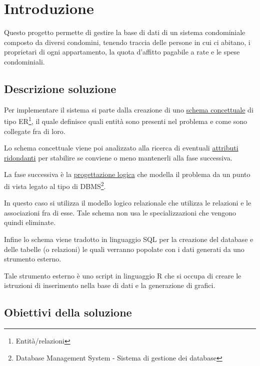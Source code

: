 \section{Introduzione}

Questo progetto permette di gestire la base di dati di
un sistema condominiale composto da diversi condomini,
tenendo traccia delle persone in cui ci abitano, i
proprietari di ogni appartamento, la quota d'affitto
pagabile a rate e le spese condominiali.

\subsection{Descrizione soluzione}

Per implementare il sistema si parte dalla creazione di uno
\hyperref[schemaER]{schema concettuale}
di tipo ER\footnote{Entità/relazioni},
il quale definisce quali entità sono presenti nel problema
e come sono collegate fra di loro.

Lo schema concettuale viene poi analizzato alla ricerca di
eventuali
\hyperref[ridondanze]{attributi ridondanti}
per stabilire se conviene o meno mantenerli alla fase successiva.

La fase successiva è la
\hyperref[logico]{progettazione logica}
che modella il problema da un punto di vista legato al tipo di
DBMS\footnote{Database Management System - Sistema di gestione dei database}.

In questo caso si utilizza il modello logico relazionale che
utilizza le relazioni e le associazioni fra di esse. Tale schema
non usa le specializzazioni che vengono quindi eliminate.

Infine lo schema viene tradotto in linguaggio SQL per la
creazione del database e delle tabelle (o relazioni) le quali
verranno popolate con i dati generati da uno strumento esterno.

Tale strumento esterno è uno script in linguaggio R che si
occupa di creare le istruzioni di inserimento nella base di dati
e la generazione di grafici.

\subsection{Obiettivi della soluzione}

